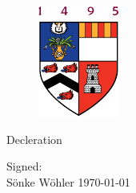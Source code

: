 \documentclass[main.tex]{subfiles}
\begin{document}
  \maketitle
  \thispagestyle{empty}
  
  \begin{figure}[h!]
    \centering
    \includegraphics{otherImages/abdnshield}
    \caption*{}
  \end{figure}
  
  \vfill
  Decleration
  
  Signed: 
  \\
  S\"onke W\"ohler \hfil \today  
\end{document}
